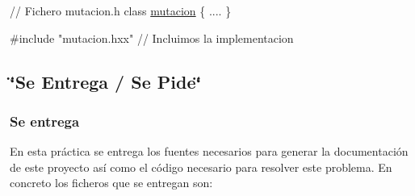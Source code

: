 \begin{DoxyCode}
\textcolor{comment}{// Fichero mutacion.h  }
\textcolor{keyword}{class }\hyperlink{classmutacion}{mutacion} \{
 ....
\}

\textcolor{preprocessor}{#include "mutacion.hxx"} \textcolor{comment}{// Incluimos la implementacion}
\end{DoxyCode}
\hypertarget{index_sec_tar}{}\subsection{\char`\"{}\+Se Entrega / Se Pide\char`\"{}}\label{index_sec_tar}
\hypertarget{index_ssEntrega}{}\subsubsection{Se entrega}\label{index_ssEntrega}
En esta práctica se entrega los fuentes necesarios para generar la documentación de este proyecto así como el código necesario para resolver este problema. En concreto los ficheros que se entregan son\+:

